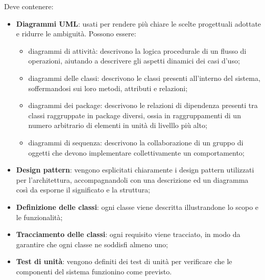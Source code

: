   Deve contenere:
  \begin{itemize}
		\item{\textbf{Diagrammi UML}}: usati per rendere più chiare le scelte progettuali adottate e ridurre le ambiguità. Possono essere:
				\begin{itemize}
							\item{diagrammi di attività}: descrivono la logica procedurale di un flusso di operazioni, aiutando a descrivere gli aspetti dinamici dei casi d'uso;
				\item{diagrammi delle classi:} descrivono le classi presenti all'interno del sistema, soffermandosi sui loro metodi, attributi e relazioni;
				\item{diagrammi dei package}: descrivono le relazioni di dipendenza presenti tra classi raggruppate in package diversi, ossia in raggruppamenti di un numero arbitrario di elementi in unità di livelllo più alto;
			\item{diagrammi di sequenza}: descrivono la collaborazione di un gruppo di oggetti che devono implementare collettivamente un comportamento;
		\end{itemize}
		\item \textbf{Design pattern}: vengono esplicitati chiaramente i design pattern utilizzati per l'architettura, accompagnandoli con una descrizione ed un diagramma così da esporne il significato e la struttura;
		\item \textbf{Definizione delle classi}: ogni classe viene descritta illustrandone lo scopo e le funzionalità;
		\item \textbf{Tracciamento delle classi}: ogni requisito viene tracciato, in modo da garantire che ogni classe ne soddisfi almeno uno;
		\item \textbf{Test di unità}: vengono definiti dei test di unità per verificare che le componenti del sistema funzionino come previsto.
  \end{itemize}

